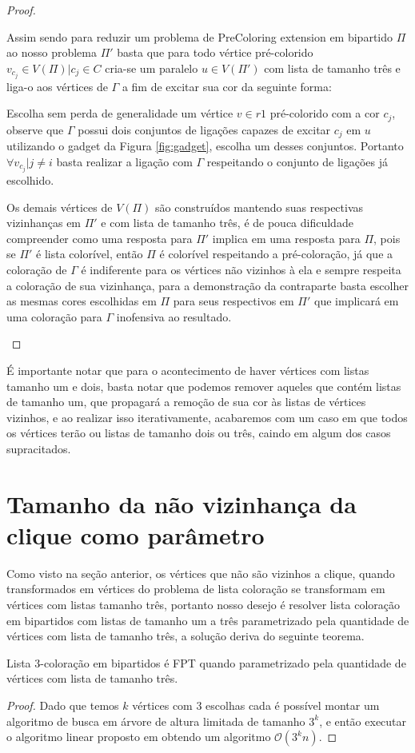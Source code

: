 \begin{proof}
\begin{itemize}
   Assim sendo para reduzir um problema de PreColoring extension em bipartido $\Pi$ ao nosso problema $\Pi'$ basta que para todo vértice pré-colorido $v_{c_j} \in V(\Pi) | c_j \in C$ cria-se um paralelo $u \in V(\Pi')$ com lista de tamanho três e liga-o aos vértices de $\Gamma$ a fim de excitar sua cor da seguinte forma: 
   
   Escolha sem perda de generalidade um vértice $v \in r1$ pré-colorido com a cor $c_j$, observe que $\Gamma$ possui dois conjuntos de ligações capazes de excitar $c_j$ em $u$ utilizando o gadget da Figura \ref{fig:gadget}, escolha um desses conjuntos. Portanto $\forall v_{c_j} | j \neq i$ basta realizar a ligação com $\Gamma$ respeitando o conjunto de ligações já escolhido.
   
    Os demais vértices de $V(\Pi)$ são construídos mantendo suas respectivas vizinhanças em $\Pi'$ e com lista de tamanho três, é de pouca dificuldade compreender como uma resposta para $\Pi'$ implica em uma resposta para $\Pi$, pois se $\Pi'$ é lista colorível, então $\Pi$ é colorível respeitando a pré-coloração, já que a coloração de $\Gamma$ é indiferente para os vértices não vizinhos à ela e sempre respeita a coloração de sua vizinhança, para a demonstração da contraparte basta escolher as mesmas cores escolhidas em $\Pi$ para seus respectivos em $\Pi'$ que implicará em uma coloração para $\Gamma$ inofensiva ao resultado. 
 \end{itemize}
\end{proof}


É importante notar que para o acontecimento de haver vértices com listas tamanho um e dois, basta notar que podemos remover aqueles que contém listas de tamanho um, que propagará a remoção de sua cor às listas de vértices vizinhos, e ao realizar isso iterativamente, acabaremos com um caso em que todos os vértices terão ou listas de tamanho dois ou três, caindo em algum dos casos supracitados.

\section{Tamanho da não vizinhança da clique como parâmetro}

Como visto na seção anterior, os vértices que não são vizinhos a clique, quando transformados em vértices do problema de lista coloração se transformam em vértices com listas tamanho três, portanto nosso desejo é resolver lista coloração em bipartidos com listas de tamanho um a três parametrizado pela quantidade de vértices com lista de tamanho três, a solução deriva do seguinte teorema.

\begin{teorema}
Lista 3-coloração em bipartidos é FPT quando parametrizado pela quantidade de vértices com lista de tamanho três.
\end{teorema}

\begin{proof}
Dado que temos $k$ vértices com 3 escolhas cada é possível montar um algoritmo de busca em árvore de altura limitada de tamanho $3^k$, e então executar o algoritmo linear proposto em \cite{hujter93} obtendo um algoritmo $\mathcal{O}(3^kn)$.
\end{proof}
